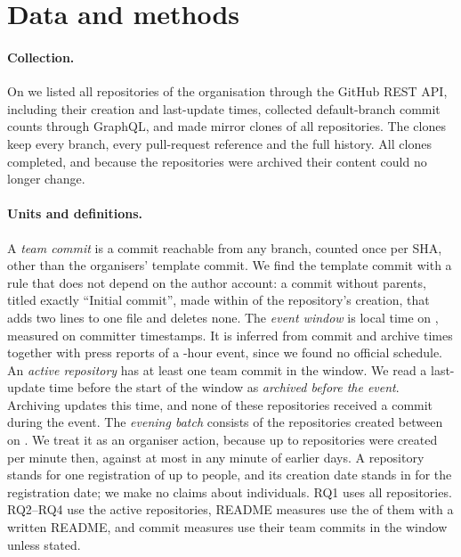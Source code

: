 \documentclass{article}
\begin{document}
\section{Data and methods}\label{sec:methods}

\paragraph{Collection.}
On \datacollected{} we listed all repositories of the organisation through the GitHub REST API, including their creation and last-update times, collected default-branch commit counts through GraphQL, and made mirror clones of all \NRqOneTotal{} repositories. The clones keep every branch, every pull-request reference and the full history. All clones completed, and because the repositories were archived their content could no longer change.

\paragraph{Units and definitions.}
A \emph{team commit} is a commit reachable from any branch, counted once per SHA, other than the organisers' template commit. We find the template commit with a rule that does not depend on the author account: a commit without parents, titled exactly ``Initial commit'', made within \templatesecs{} of the repository's creation, that adds two lines to one file and deletes none. The \emph{event window} is \eventwindow{} local time on \eventdate, measured on committer timestamps. It is inferred from commit and archive times together with press reports of a \eventhours-hour event, since we found no official schedule. An \emph{active repository} has at least one team commit in the window. We read a last-update time before the start of the window as \emph{archived before the event}. Archiving updates this time, and none of these repositories received a commit during the event. The \emph{evening batch} consists of the repositories created between \batchwindow{} on \batchday{}. We treat it as an organiser action, because up to \NRqOneBatchMaxPerMinute{} repositories were created per minute then, against at most \NRqOneBatchOrganicMaxPerMinute{} in any minute of earlier days. A repository stands for one registration of up to \teamsizemax{} people, and its creation date stands in for the registration date; we make no claims about individuals. RQ1 uses all \NRqOneTotal{} repositories. RQ2--RQ4 use the \NRqOneActiveN{} active repositories, README measures use the \NRqThreeReadmeWritten{} of them with a written README, and commit measures use their team commits in the window unless stated.
\end{document}
